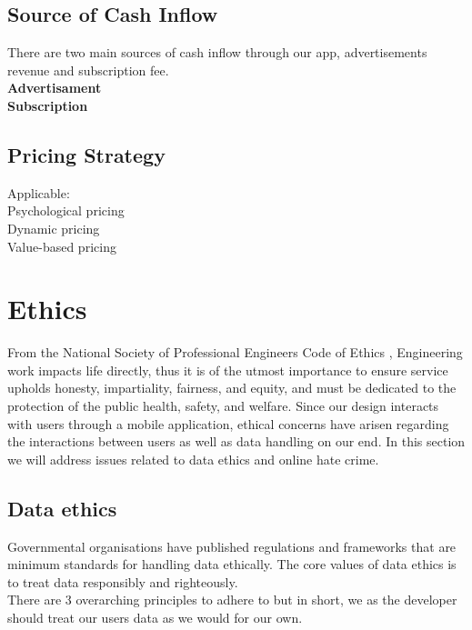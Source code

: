  \subsection{Source of Cash Inflow}
 There are two main sources of cash inflow through our app, advertisements revenue and subscription fee.
 \\ \textbf{Advertisament}
 \\ \textbf{Subscription}
 
 
 \subsection{Pricing Strategy}
 Applicable:
 \\Psychological pricing
 \\Dynamic pricing
 \\Value-based pricing

\section{Ethics}
From the National Society of Professional Engineers Code of Ethics \cite{codeofethics}, Engineering
work impacts life directly, thus it is of the utmost importance to ensure service 
upholds honesty, impartiality, fairness, and equity, and must be dedicated to the protection of
the public health, safety, and welfare. Since our design interacts with users
through a mobile application, ethical concerns have arisen regarding the interactions between users 
as well as data handling on our end. In this section we will address issues related to data ethics 
and online hate crime.

\subsection{Data ethics}
\label{dataethics}
Governmental organisations have published regulations \cite{EUdataregulations2018} and frameworks
\cite{framework} that are minimum standards for handling data ethically. The core values of data ethics 
is to treat data responsibly and righteously.
\\
There are 3 overarching principles\cite{framework} to adhere to but in short, we as the developer should treat our 
users\textsc{} data as we would for our own.

